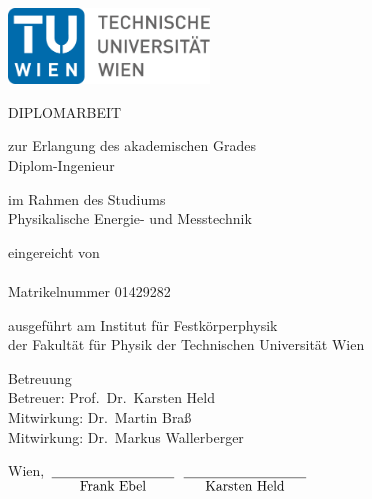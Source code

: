 
\begin{titlepage}
    \includegraphics[width=0.4\textwidth]{graphics/figures/logo_tu.pdf}
    \begin{center}
        \vspace{1.5cm}

        {\large DIPLOMARBEIT}

        \vspace{1em}

        {\Huge \textbf{\@title}}

        \vspace{2em}

        \begin{large}
            zur Erlangung des akademischen Grades\\
            Diplom-Ingenieur

            \vspace{1em}

            im Rahmen des Studiums\\
            Physikalische Energie- und Messtechnik

            \vspace{1em}

            eingereicht von\\
            \@author\\
            Matrikelnummer 01429282\\
        \end{large}
    \end{center}

    \vspace{4em}

    \noindent ausgeführt am Institut für Festkörperphysik\\
    der Fakultät für Physik der Technischen Universität Wien

    \vspace{1em}

    \noindent Betreuung\\
    Betreuer: Prof.\ Dr.\ Karsten Held\\
    Mitwirkung: Dr.\ Martin Braß\\
    Mitwirkung: Dr.\ Markus Wallerberger

    \vspace{5em}

    \noindent Wien, \@date
    \hspace{4em}
    $\underset{\text{\normalsize Frank Ebel}}{\underline{\hspace{9em}}}$
    \hspace{4em}
    $\underset{\text{\normalsize Karsten Held}}{\underline{\hspace{9em}}}$
\end{titlepage}
